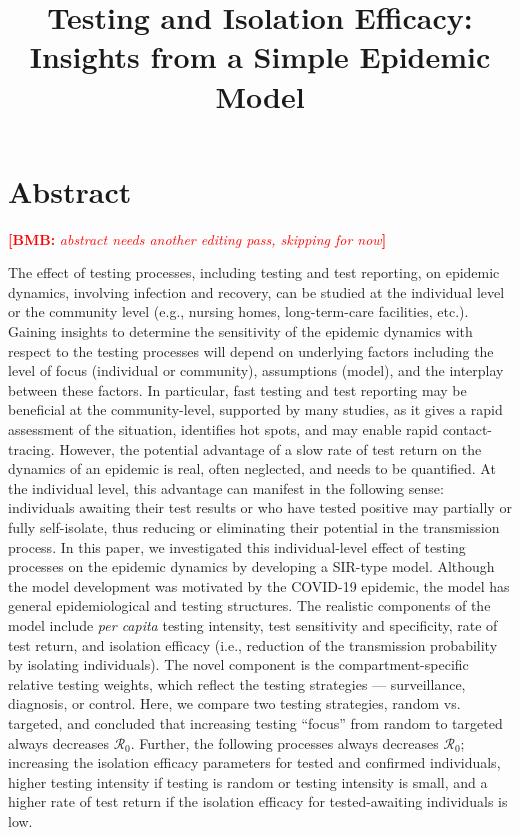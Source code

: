 \documentclass[12pt]{article}
\title{Testing and Isolation Efficacy: Insights from a Simple Epidemic Model}
\newcommand{\percap}{\emph{per capita}\xspace}
\newcommand{\Rnum}{\ensuremath{\mathcal{R}_0}\xspace}
\newcommand{\covid}{COVID-19\xspace}
\DeclareRobustCommand\_{\ifmmode\expandafter\subtxt\else\textunderscore\fi}
\newcommand{\comment}{\showcomment}
\newcommand{\showcomment}[3]{\textcolor{#1}{\textbf{[#2: }\textsl{#3}\textbf{]}}}
\newcommand{\bmb}[1]{\comment{red}{BMB}{#1}}
\theoremstyle{definition} %
\begin{document}
\maketitle

\linenumbers

\section{Abstract}

\bmb{abstract needs another editing pass, skipping for now}

The effect of testing processes, including testing and test reporting, on epidemic dynamics, involving infection and recovery, can be studied at the individual level or the community level (e.g., nursing homes, long-term-care facilities, etc.).
Gaining insights to determine the sensitivity of the epidemic dynamics with respect to the testing processes will depend on underlying factors including the level of focus (individual or community), assumptions (model), and the interplay between these factors. 
In particular, fast testing and test reporting may be beneficial at the community-level, supported by many studies, as it gives a rapid assessment of the situation, identifies hot spots, and may enable rapid contact-tracing. However, the potential advantage of a slow rate of test return on the dynamics of an epidemic is real, often neglected, and needs to be quantified. At the individual level, this advantage can manifest in the following sense: individuals awaiting their test results or who have tested positive may partially or fully self-isolate, thus reducing or eliminating their potential in the transmission process.
In this paper, we investigated this individual-level effect of testing processes on the epidemic dynamics by developing a SIR-type model.
Although the model development was motivated by the \covid epidemic, the model has general epidemiological and testing structures. The realistic components of the model include \percap testing intensity, test sensitivity and specificity, rate of test return, and isolation efficacy (i.e., reduction of the transmission probability by isolating individuals). The novel component is the compartment-specific relative testing weights, which reflect the testing strategies --- surveillance, diagnosis, or control. Here, we compare two testing strategies, random vs. targeted, and concluded that increasing testing “focus” from random to targeted always decreases \Rnum. Further, the following processes always decreases $\Rnum$; increasing the isolation efficacy parameters for tested and confirmed individuals, higher testing intensity if testing is random or testing intensity is small, and a higher rate of test return if the isolation efficacy for tested-awaiting individuals is low.
\end{document}
